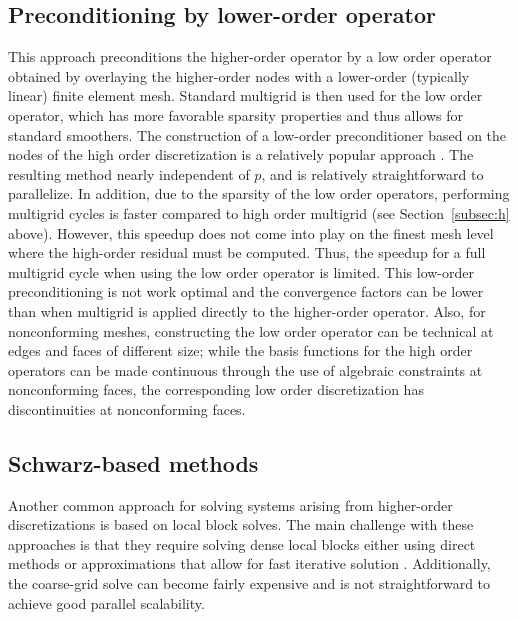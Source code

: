 \documentclass[times]{nlaauth}
\begin{document}
\subsection{Preconditioning by lower-order operator}\label{subsec:low}
This approach preconditions the higher-order operator by a low order
operator obtained by overlaying the higher-order nodes with a
lower-order (typically linear) finite element mesh. Standard multigrid
is then used for the low order operator, which has more favorable
sparsity properties and thus allows for standard smoothers.  The
construction of a low-order preconditioner based on the nodes of the
high order discretization is a relatively popular approach
\cite{Brown10,Kim07,DevilleMund?}. The resulting method nearly
independent of $p$, and is relatively straightforward to parallelize.
In addition, due to the sparsity of the low order operators,
performing multigrid cycles is faster compared to high order multigrid
(see Section~\ref{subsec:h} above).  However, this speedup does not
come into play on the finest mesh level where the high-order residual
must be computed. Thus, the speedup for a full multigrid cycle when
using the low order operator is limited.  This low-order
preconditioning is not work optimal and the convergence factors can be
lower than when multigrid is applied directly to the higher-order
operator. Also, for nonconforming meshes, constructing the low order
operator can be technical at edges and faces of different size; while
the basis functions for the high order operators can be made
continuous through the use of algebraic constraints at nonconforming
faces, the corresponding low order discretization has discontinuities
at nonconforming faces.






\subsection{Schwarz-based methods}\label{subsec:schwarz}
Another common approach for solving systems arising from higher-order
discretizations is based on local block solves.  The main challenge
with these approaches is that they require solving dense local blocks
either using direct methods or approximations that allow for fast
iterative solution \cite{LottesFischer05,FischerLottes05}.
Additionally, the coarse-grid solve can become fairly expensive and is
not straightforward to achieve good parallel scalability.
\end{document}
